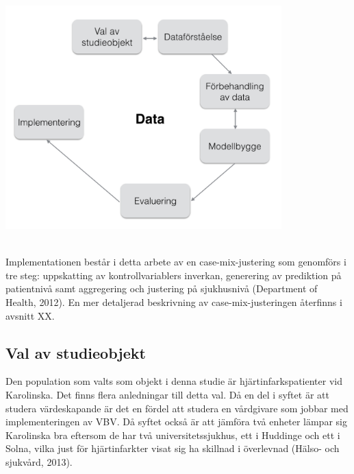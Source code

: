 \noindent\begin{minipage}{\textwidth}
\centering
\includegraphics[width=0.8\textwidth]{Data.png}
\label{fig:design}            
\end{minipage}
\\

Implementationen består i detta arbete av en case-mix-justering som genomförs i tre steg: uppskatting av kontrollvariablers inverkan, generering av prediktion på patientnivå samt aggregering och justering på sjukhusnivå (Department of Health, 2012). En mer detaljerad beskrivning av case-mix-justeringen återfinns i avsnitt XX. 
\subsection{Val av studieobjekt}

Den population som valts som objekt i denna studie är hjärtinfarkspatienter vid Karolinska. Det finns flera anledningar till detta val. Då en del i syftet är att studera värdeskapande är det en fördel att studera en vårdgivare som jobbar med implementeringen av VBV. Då syftet också är att jämföra två enheter lämpar sig Karolinska bra eftersom de har två universitetssjukhus, ett i Huddinge och ett i Solna, vilka just för hjärtinfarkter visat sig ha skillnad i överlevnad (Hälso- och sjukvård, 2013).

